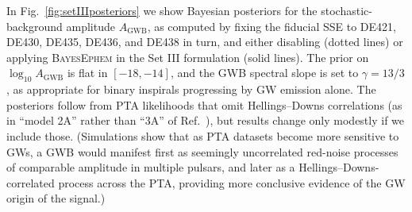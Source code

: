 \documentclass[reprint,
 amsmath,amssymb,
 aps,prd,floatfix,
]{revtex4-1}
\begin{document}
In Fig.\ \ref{fig:setIIIposteriors} we show Bayesian posteriors for the stochastic-background amplitude $A_\mathrm{GWB}$, as computed by fixing the fiducial SSE to DE421, DE430, DE435, DE436, and DE438 in turn, and either disabling (dotted lines) or applying \textsc{BayesEphem} in the Set III formulation (solid lines). The prior on $\log_{10} A_\mathrm{GWB}$ is flat in $[-18,-14]$, and the GWB spectral slope is set to $\gamma = 13/3$, as appropriate for binary inspirals progressing by GW emission alone. The posteriors follow from PTA likelihoods that omit Hellings--Downs correlations (as in ``model 2A'' rather than ``3A'' of Ref.\ \cite{2018ApJ...859...47A}), but results change only modestly if we include those.
(Simulations show that as PTA datasets become more sensitive to GWs, a GWB would manifest first as seemingly uncorrelated red-noise processes of comparable amplitude in multiple pulsars, and later as a Hellings--Downs-correlated process across the PTA, providing more conclusive evidence of the GW origin of the signal.)
\end{document}
